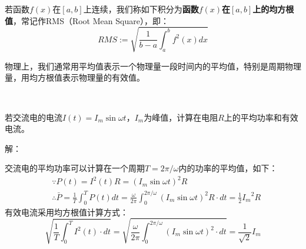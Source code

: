 \begin{definition}[函数的均方根值]

若函数$f\left( x \right) $在$\left[ a,b \right] $上连续，我们称如下积分为{\bf 函数$f\left( x \right) $在$\left[ a,b \right] $上的均方根值}，常记作RMS（Root Mean Square），即：
\[
RMS:=\sqrt{\frac{1}{b-a}\int_a^b{f^2\left( x \right) dx}}
\]
\end{definition}

物理上，我们通常用平均值表示一个物理量一段时间内的平均值，特别是周期物理量，用均方根值表示物理量的有效值。

~

\begin{example}
若交流电的电流$I\left( t \right) =I_m\sin \omega t$，$I_m$为峰值，计算在电阻$R$上的平均功率和有效电流。
\end{example}

解：

交流电的平均功率可以计算在一个周期$T=2\pi /\omega $内的功率的平均值，如下：
\begin{align*}
&\because P\left( t \right) =I^2\left( t \right) R=\left( I_m\sin \omega t \right) ^2R \\
&\therefore \bar{P}=\frac{1}{T}\int_0^T{P\left( t \right) dt}=\frac{\omega}{2\pi}\int_0^{2\pi /\omega}{\left( I_m\sin \omega t \right) ^2R\cdot dt}=\frac{1}{2}{I_m}^2R
\end{align*}
有效电流采用均方根值计算方式：
\[
\sqrt{\frac{1}{T}\int_0^T{I^2\left( t \right) \cdot dt}}=\sqrt{\frac{\omega}{2\pi}\int_0^{2\pi /\omega}{\left( I_m\sin \omega t \right) ^2\cdot dt}}=\frac{1}{\sqrt{2}}I_m
\]




